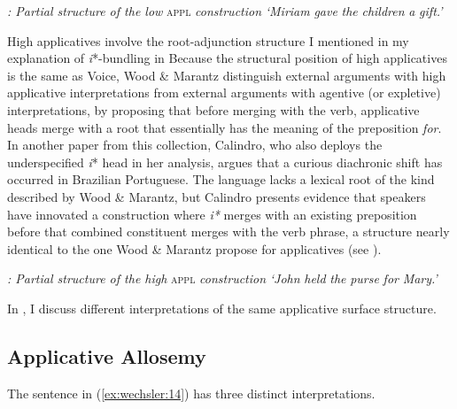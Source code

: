 \documentclass[output=paper]{langscibook}
\begin{document}
  
 



\textit{: Partial structure of the low} \textsc{appl} \textit{construction} \textit{‘Miriam} \textit{gave} \textit{the} \textit{children} \textit{a} \textit{gift.’}



High applicatives involve the root-adjunction structure I mentioned in my explanation of \textit{i}*-bundling in  Because the structural position of high applicatives is the same as Voice, Wood \& Marantz distinguish external arguments with high applicative interpretations from external arguments with agentive (or expletive) interpretations, by proposing that before merging with the verb, applicative heads merge with a root that essentially has the meaning of the preposition \textit{for}. In another paper from this collection, Calindro, who also deploys the underspecified \textit{i}* head in her analysis, argues that a curious diachronic shift has occurred in Brazilian Portuguese. The language lacks a lexical root of the kind described by Wood \& Marantz, but Calindro presents evidence that speakers have innovated a construction where \textit{i*} merges with an existing preposition before that combined constituent merges with the verb phrase, a structure nearly identical to the one Wood \& Marantz propose for applicatives (see ). 



  
 



\textit{: Partial structure of the high} \textsc{appl} \textit{construction} \textit{‘John} \textit{held} \textit{the} \textit{purse} \textit{for} \textit{Mary.’}



In , I discuss different interpretations of the same applicative surface structure. 


\subsection{Applicative Allosemy}\label{sec:wechsler:3.2}

The sentence in (\ref{ex:wechsler:14}) has three distinct interpretations. 
\end{document}
